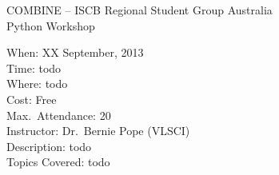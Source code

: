 \documentclass[final,xcolor={usenames,x11names,svgnames}]{beamer}
\begin{document}
    \begin{frame}
        \vspace{-2.5\baselineskip}
        \begin{center}
            \small COMBINE -- ISCB Regional Student Group Australia\\[1.0ex]
            \Large Python Workshop
            \normalsize
        \end{center}
        \vfill
        \begin{minipage}[c]{\textwidth}
            When: XX September, 2013\\
            Time: todo\\
            Where: todo\\
            Cost: Free\\
            Max.~Attendance: 20\\
            Instructor: Dr.~Bernie Pope (VLSCI)\\
            Description: todo\\
            Topics Covered: todo\\
        \end{minipage}
        \vfill
    \end{frame}
\end{document}
